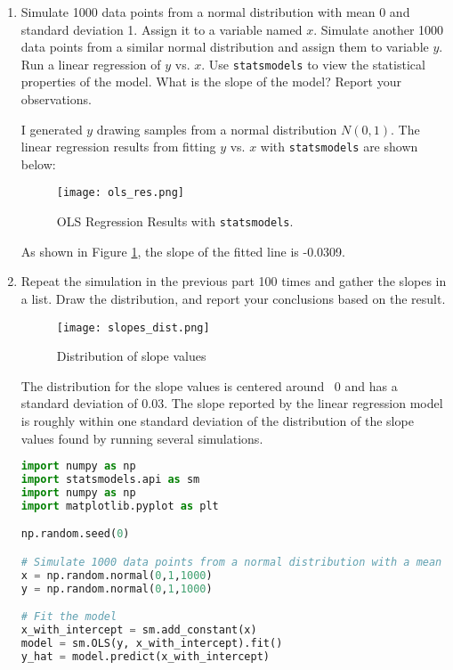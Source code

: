 \documentclass{article}
\begin{document}
\begin{enumerate}[label={(\alph*)}]
    \item Simulate 1000 data points from a normal distribution with mean 0 and standard
    deviation 1. Assign it to a variable named $x$. Simulate another 1000 data points
    from a similar normal distribution and assign them to variable $y$. Run a linear
    regression of $y$ vs. $x$. Use \texttt{statsmodels} to view the statistical
    properties of the model. What is the slope of the model? Report your observations.
    
    I generated $y$ drawing samples from a normal distribution $N(0,1)$. The linear regression results from fitting $y$ vs. $x$ with \texttt{statsmodels} are shown below:
    \begin{figure}[h]
        \centering
        \texttt{[image: ols\_res.png]}
        \caption{OLS Regression Results with \texttt{statsmodels}.}
        \label{fig:ols_res}
    \end{figure}
    
    As shown in Figure \ref{fig:ols_res}, the slope of the fitted line is -0.0309.
    
    \item Repeat the simulation in the previous part 100 times and gather the
    slopes in a list. Draw the distribution, and report your conclusions based
    on the result.
    \begin{figure}[h]
        \centering
        \texttt{[image: slopes\_dist.png]}
        \caption{Distribution of slope values}
        \label{fig:slopes}
    \end{figure}
    
    The distribution for the slope values is centered around ~0 and has a standard
    deviation of 0.03. The slope reported by the linear regression model is roughly 
    within one standard deviation of the distribution of the slope values found by 
    running several simulations.
\begin{lstlisting}[language=Python, caption=Standard Error and Confidence]
import numpy as np
import statsmodels.api as sm
import numpy as np
import matplotlib.pyplot as plt

np.random.seed(0)

# Simulate 1000 data points from a normal distribution with a mean 0 and std 1
x = np.random.normal(0,1,1000)
y = np.random.normal(0,1,1000)

# Fit the model
x_with_intercept = sm.add_constant(x)
model = sm.OLS(y, x_with_intercept).fit()
y_hat = model.predict(x_with_intercept)


\end{lstlisting}
\end{enumerate}
\end{document}
